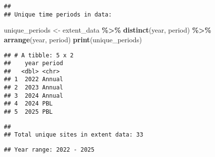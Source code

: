\documentclass[
]{article}
\newenvironment{Shaded}{\begin{snugshade}}{\end{snugshade}}
\newcommand{\FunctionTok}[1]{\textcolor[rgb]{0.13,0.29,0.53}{\textbf{#1}}}
\newcommand{\NormalTok}[1]{#1}
\newcommand{\OtherTok}[1]{\textcolor[rgb]{0.56,0.35,0.01}{#1}}
\newcommand{\SpecialCharTok}[1]{\textcolor[rgb]{0.81,0.36,0.00}{\textbf{#1}}}
\newcommand{\StringTok}[1]{\textcolor[rgb]{0.31,0.60,0.02}{#1}}
\begin{document}
\begin{verbatim}
## 
## Unique time periods in data:
\end{verbatim}

\begin{Shaded}
\begin{Highlighting}[]
\NormalTok{unique\_periods }\OtherTok{\textless{}{-}}\NormalTok{ extent\_data }\SpecialCharTok{\%\textgreater{}\%} 
  \FunctionTok{distinct}\NormalTok{(year, period) }\SpecialCharTok{\%\textgreater{}\%} 
  \FunctionTok{arrange}\NormalTok{(year, period)}
\FunctionTok{print}\NormalTok{(unique\_periods)}
\end{Highlighting}
\end{Shaded}

\begin{verbatim}
## # A tibble: 5 x 2
##    year period
##   <dbl> <chr> 
## 1  2022 Annual
## 2  2023 Annual
## 3  2024 Annual
## 4  2024 PBL   
## 5  2025 PBL
\end{verbatim}

\begin{Shaded}
\end{Shaded}

\begin{verbatim}
## 
## Total unique sites in extent data: 33
\end{verbatim}

\begin{Shaded}
\end{Shaded}

\begin{verbatim}
## Year range: 2022 - 2025
\end{verbatim}
\end{document}
